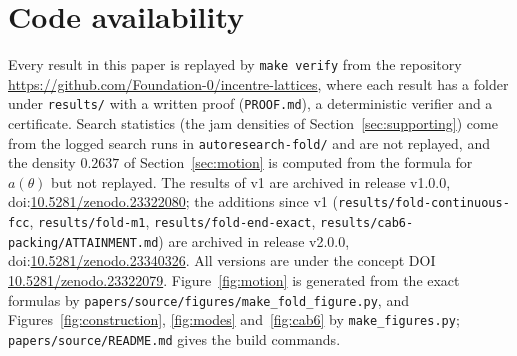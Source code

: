 \documentclass[11pt]{amsart}
\theoremstyle{definition}
\theoremstyle{remark}
\begin{document}
\section*{Code availability}
{\sloppy Every result in this paper is replayed by \texttt{make verify} from the repository \url{https://github.com/Foundation-0/incentre-lattices}, where each result has a folder under \texttt{results/} with a written proof (\texttt{PROOF.md}), a deterministic verifier and a certificate. Search statistics (the jam densities of Section~\ref{sec:supporting}) come from the logged search runs in \texttt{autoresearch-fold/} and are not replayed, and the density $0.2637$ of Section~\ref{sec:motion} is computed from the formula for $a(\theta)$ but not replayed. The results of v1 are archived in release v1.0.0, doi:\href{https://doi.org/10.5281/zenodo.23322080}{10.5281/zenodo.23322080}; the additions since v1 (\texttt{results/fold-continuous-fcc}, \texttt{results/fold-m1}, \texttt{results/fold-end-exact}, \texttt{results/cab6-packing/ATTAINMENT.md}) are archived in release v2.0.0, doi:\href{https://doi.org/10.5281/zenodo.23340326}{10.5281/zenodo.23340326}. All versions are under the concept DOI \href{https://doi.org/10.5281/zenodo.23322079}{10.5281/zenodo.23322079}. Figure~\ref{fig:motion} is generated from the exact formulas by \texttt{papers/source/figures/make\_fold\_figure.py}, and Figures~\ref{fig:construction}, \ref{fig:modes} and~\ref{fig:cab6} by \texttt{make\_figures.py}; \texttt{papers/source/README.md} gives the build commands.\par}



\end{document}
